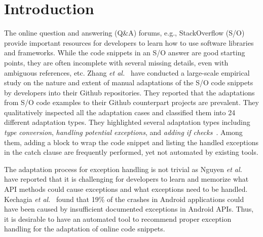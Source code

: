 \section{Introduction}
\label{sec:intro}

The online question and answering (Q\&A) forums, e.g., StackOverflow
(S/O) provide important resources for developers to learn how to use
software libraries and frameworks. While the code snippets in an S/O
answer are good starting points, they are often incomplete with
several missing details, even with ambiguous references, etc.  Zhang
{\em et al.}~\cite{zhang-icse19} have conducted a large-scale
empirical study on the nature and extent of manual adaptations of the
S/O code snippets by developers into their Github repositories.  They
reported that the adaptations from S/O code examples to their
Github counterpart projects are prevalent. They
qualitatively inspected all the adaptation cases and classified them
into 24 different adaptation types. They highlighted several
adaptation types including {\em type conversion}, {\em handling
  potential exceptions}, and {\em adding if
  checks}~\cite{zhang-icse19}. Among them, adding a 
block to wrap the code snippet and listing the handled
exceptions in the catch clause are frequently performed,
yet not automated by existing tools.

The adaptation process for exception handling is not trivial as Nguyen
{\em et al.}~\cite{xrank-fse20} have reported that it is challenging
for developers to learn and memorize what API methods could cause
exceptions and what exceptions need to be handled. Kechagia {\em et
  al.}~\cite{kechagia-msr14} found that 19\% of the crashes in Android
applications could have been caused by insufficient documented
exceptions in Android APIs. Thus, it is desirable to have an automated
tool to recommend proper exception handling for the adaptation of
online code snippets.

